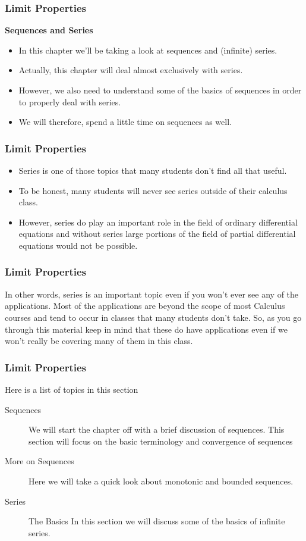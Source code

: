 \documentclass{beamer}
\begin{document}
\begin{frame}[fragile]
	\frametitle{Limit Properties}
	\Large
	\textbf{Sequences and Series}\\
	\begin{itemize}
\item In this chapter we’ll be taking a look at sequences and (infinite) series. 
\item Actually, this chapter will deal almost exclusively with series. 
\item However, we also need to understand some of the basics of sequences in order to properly deal with series.  
\item We will therefore, spend a little time on sequences as well.
\end{itemize}
\end{frame}
\begin{frame}[fragile]
	\frametitle{Limit Properties}
	\Large
	\begin{itemize}
		\item  Series is one of those topics that many students don’t find all that useful. \item To be honest, many students will never see series outside of their calculus class. \item However, series do play an important role in the field of ordinary differential equations and without series large portions of the field of partial differential equations would not be possible.
\end{itemize}
\end{frame}
\begin{frame}[fragile]
	\frametitle{Limit Properties}
	\Large
In other words, series is an important topic even if you won’t ever see any of the applications.  Most of the applications are beyond the scope of most Calculus courses and tend to occur in classes that many students don’t take.  So, as you go through this material keep in mind that these do have applications even if we won’t really be covering many of them in this class.
 
\end{frame}
\begin{frame}[fragile]
	\frametitle{Limit Properties}
	\Large
Here is a list of topics in this section
 
\begin{description}
	\item[Sequences ] We will start the chapter off with a brief discussion of sequences.  This section will focus on the basic terminology and convergence of sequences
 
\item[More on Sequences]  Here we will take a quick look about monotonic and bounded sequences.
 
\item[Series]  The Basics  In this section we will discuss some of the basics of infinite series.
\end{description}
\end{frame}
\end{document}
